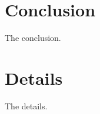 \documentclass[amsmath,amssymb,aps,prd,10pt,twocolumn,showkeys]{revtex4}
\begin{document}
\section{Conclusion}
\label{sec:conc}

The conclusion.

\appendix

\section{Details}
\label{app:a}

The details.


\end{document}
